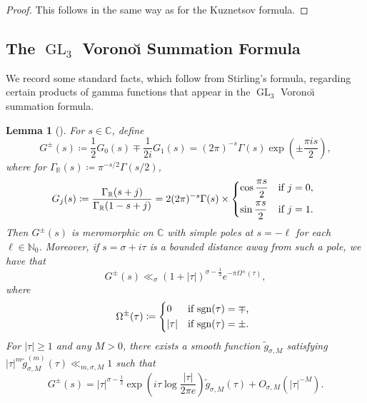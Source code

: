 \documentclass[11pt,a4paper]{amsart}
\newcommand{\C}{\mathbb{C}}
\newcommand{\N}{\mathbb{N}}
\newcommand{\R}{\mathbb{R}}
\DeclareMathOperator{\GL}{GL}
\DeclareMathOperator{\sgn}{sgn}
\numberwithin{equation}{section}
\newtheorem{lemma}[equation]{Lemma}
\theoremstyle{remark}
\theoremstyle{definition}
\begin{document}
\begin{proof}
This follows in the same way as for the Kuznetsov formula.
\end{proof}


\subsection{The \texorpdfstring{$\GL_3$}{GL\textthreeinferior} Vorono\u{\i} Summation Formula}

We record some standard facts, which follow from Stirling's formula, regarding certain products of gamma functions that appear in the $\GL_3$ Vorono\u{\i} summation formula.

\begin{lemma}[{\cite[Section 2.2 and Lemma 4]{BK19}}]
For $s \in \C$, define
\begin{equation}
\label{eqn:Gpm}
G^{\pm}(s) \coloneqq \frac{1}{2} G_0(s) \mp \frac{1}{2i} G_1(s) = (2\pi)^{-s} \Gamma(s) \exp\left(\pm \frac{\pi i s}{2}\right),
\end{equation}
where for $\Gamma_{\R}(s) \coloneqq \pi^{-s/2} \Gamma(s/2)$,
\[G_j(s) \coloneqq \frac{\Gamma_{\R}(s + j)}{\Gamma_{\R}(1 - s + j)} = 2(2\pi)^{-s} \Gamma(s) \times \begin{dcases*}
\cos \frac{\pi s}{2} & if $j = 0$,	\\
\sin \frac{\pi s}{2} & if $j = 1$.
\end{dcases*}\]
Then $G^{\pm}(s)$ is meromorphic on $\C$ with simple poles at $s = -\ell$ for each $\ell \in \N_0$. Moreover, if $s = \sigma + i\tau$ is a bounded distance away from such a pole, we have that
\begin{equation}
\label{eqn:Gpmbounds}
G^{\pm}(s) \ll_{\sigma} (1 + |\tau|)^{\sigma - \frac{1}{2}} e^{-\pi \Omega^{\pm}(\tau)},
\end{equation}
where
\[\Omega^{\pm}(\tau) \coloneqq \begin{dcases*}
0 & if $\sgn(\tau) = \mp$,	\\
|\tau| & if $\sgn(\tau) = \pm$.
\end{dcases*}\]
For $|\tau| \geq 1$ and any $M > 0$, there exists a smooth function $\widetilde{g}_{\sigma,M}$ satisfying $|\tau|^m \widetilde{g}_{\sigma,M}^{(m)}(\tau) \ll_{m,\sigma,M} 1$ such that
\begin{equation}
\label{eqn:Gpmasymp}
G^{\pm}(s) = |\tau|^{\sigma - \frac{1}{2}} \exp\left(i\tau \log \frac{|\tau|}{2\pi e}\right) \widetilde{g}_{\sigma,M}(\tau) + O_{\sigma,M}(|\tau|^{-M}).
\end{equation}


\end{lemma}
\end{document}
